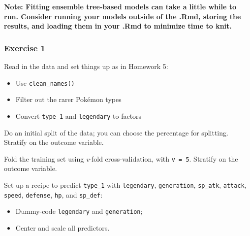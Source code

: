 \documentclass[
]{article}
\providecommand{\tightlist}{%
  \setlength{\itemsep}{0pt}\setlength{\parskip}{0pt}}
\begin{document}
\textbf{Note: Fitting ensemble tree-based models can take a little while
to run. Consider running your models outside of the .Rmd, storing the
results, and loading them in your .Rmd to minimize time to knit.}

\hypertarget{exercise-1}{%
\subsubsection{Exercise 1}\label{exercise-1}}

Read in the data and set things up as in Homework 5:

\begin{itemize}
\tightlist
\item
  Use \texttt{clean\_names()}
\item
  Filter out the rarer Pokémon types
\item
  Convert \texttt{type\_1} and \texttt{legendary} to factors
\end{itemize}

Do an initial split of the data; you can choose the percentage for
splitting. Stratify on the outcome variable.

Fold the training set using \emph{v}-fold cross-validation, with
\texttt{v\ =\ 5}. Stratify on the outcome variable.

Set up a recipe to predict \texttt{type\_1} with \texttt{legendary},
\texttt{generation}, \texttt{sp\_atk}, \texttt{attack}, \texttt{speed},
\texttt{defense}, \texttt{hp}, and \texttt{sp\_def}:

\begin{itemize}
\tightlist
\item
  Dummy-code \texttt{legendary} and \texttt{generation};
\item
  Center and scale all predictors.
\end{itemize}
\end{document}
